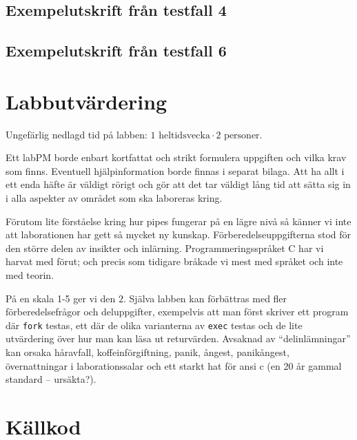 \documentclass[a4paper,10pt,titlepage]{article}
\begin{document}
\subsection{Exempelutskrift från testfall 4}



\subsection{Exempelutskrift från testfall 6}



\newpage
\section{Labbutvärdering}

Ungefärlig nedlagd tid på labben: $1 \text{ heltidsvecka} \cdot 2 \text{ personer}$.

Ett labPM borde enbart kortfattat och strikt formulera uppgiften och vilka krav som finns.
Eventuell hjälpinformation borde finnas i separat bilaga. Att ha allt i ett enda häfte är väldigt rörigt och gör att det tar väldigt lång tid att sätta sig in i alla aspekter av området som ska laboreras kring.

Förutom lite förståelse kring hur pipes fungerar på en lägre nivå så känner vi inte att laborationen har gett så mycket ny kunskap. Förberedelseuppgifterna stod för den större delen av insikter och inlärning. Programmeringsspråket C har vi harvat med förut; och precis som tidigare bråkade vi mest med språket och inte med teorin.

På en skala 1-5 ger vi den $2$. Själva labben kan förbättras med fler förberedelsefrågor och deluppgifter, exempelvis att man först skriver ett program där \verb!fork! testas, ett där de olika varianterna av \verb!exec! testas och de lite utvärdering över hur man kan läsa ut returvärden. Avsaknad av ``delinlämningar'' kan orsaka håravfall, koffeinförgiftning, panik, ångest, panikångest, övernattningar i laborationssalar och ett starkt hat för ansi c (en 20 år gammal standard -- ursäkta?).

\newpage
\section{Källkod}

\lstset{tabsize=2}
\footnotesize{}
\end{document}
